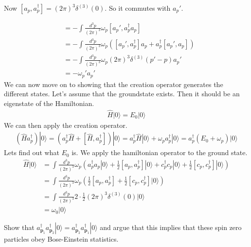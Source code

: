 \documentclass[working, oneside]{../../Preambles/tuftebook}
\begin{document}
\begin{solution}
Now \( [a_p, a_p^\dagger] = (2\pi)^3 \delta^{(3)}(0) \). So it commutes with \( a_p' \).

\begin{align*}
    &= -\int \frac{d^3p}{(2\pi)^3} \omega_p [a_p', a_p^\dagger a_p] \\
    &= -\int \frac{d^3p}{(2\pi)^3} \omega_p ([a_p', a_p^\dagger] a_p + a_p^\dagger [a_p', a_p]) \\
    &= -\int \frac{d^3p}{(2\pi)^3} \omega_p (2\pi)^3 \delta^{(3)}(p' - p) a_p' \\
    &= -\omega_p' a_p'
\end{align*}
We can now move on to showing that the creation operator generates the different states. Let's assume that the groundstate exists. Then it should be an eigenstate of the Hamiltonian.
\begin{align*}
    \hat{H} |0\rangle = E_0 |0\rangle
\end{align*}
We can then apply the creation operator.
\begin{align*}
    (\hat{H} a_p^\dagger) |0\rangle = (a_p^\dagger \hat{H} + [\hat{H}, a_p^\dagger]) |0\rangle = a_p^\dagger \hat{H} |0\rangle + \omega_p a_p^\dagger |0\rangle = a_p^\dagger (E_0 + \omega_p) |0\rangle
\end{align*}
Lets find out what $E_0$ is. We apply the hamiltonian operator to the ground state.
\begin{align*}
    \hat{H} |0\rangle &= \int \frac{d^3p}{(2\pi)^3} \omega_p \left(a_p^\dagger a_p |0\rangle + \frac{1}{2} [a_p, a_p^\dagger] |0\rangle+ c_p^\dagger c_p |0\rangle + \frac{1}{2} [c_p, c_p^\dagger] |0\rangle\right) \\
    &= \int \frac{d^3p}{(2\pi)^3} \omega_p \left( \frac{1}{2} [a_p, a_p^\dagger] + \frac{1}{2} [c_p, c_p^\dagger] |0\rangle\right) \\
    &= \int \frac{d^3p}{(2\pi)^3} 2 \cdot \frac{1}{2} (2\pi)^3 \delta^{(3)}(0) |0\rangle \\
    &= \omega_0 |0\rangle
\end{align*}
\end{solution}
\begin{exercise}[2.10]
Show that $a^\dagger_{\mathbf{p}_1} a^\dagger_{\mathbf{p}_2} |0\rangle = a^\dagger_{\mathbf{p}_2} a^\dagger_{\mathbf{p}_1} |0\rangle$ and argue that this implies that these spin zero particles obey Bose-Einstein statistics.
\end{exercise}
\end{document}
